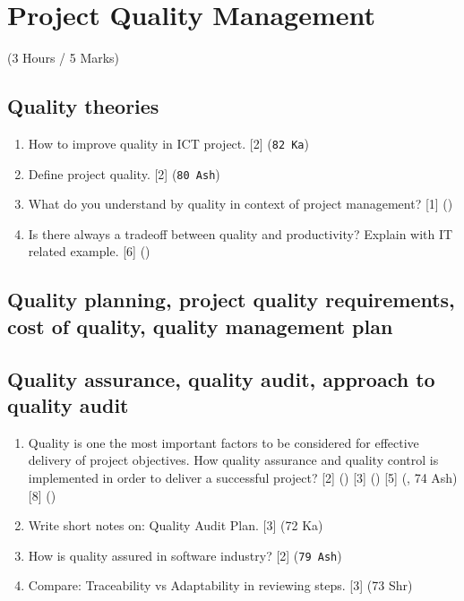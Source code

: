 \documentclass[12pt]{article}
\begin{document}
\pagebreak

\section{Project Quality Management}
  \begin{center}(3 Hours / 5 Marks)\end{center}

  \subsection{Quality theories}
    \begin{enumerate}
      \item How to improve quality in ICT project. \hfill [2] (\texttt{82 Ka})

      \item Define project quality. \hfill [2] (\texttt{80 Ash})

      \item What do you understand by quality in context of project management? \hfill [1] ()

      \item Is there always a tradeoff between quality and productivity? Explain with IT related example. \hfill [6] ()
    \end{enumerate}

  \subsection{Quality planning, project quality requirements, cost of quality, quality management plan}

  \subsection{Quality assurance, quality audit, approach to quality audit}
    \begin{enumerate}
      \item Quality is one the most important factors to be considered for effective delivery of project objectives. How quality assurance and quality control is implemented in order to deliver a successful project? \hfill [2] () [3] () [5] (, 74 Ash) [8] ()

      \item Write short notes on: Quality Audit Plan. \hfill [3] (72 Ka)

      \item How is quality assured in software industry? \hfill [2] (\texttt{79 Ash})

      \item Compare: Traceability vs Adaptability in reviewing steps. \hfill [3] (73 Shr)
    \end{enumerate}
\end{document}
